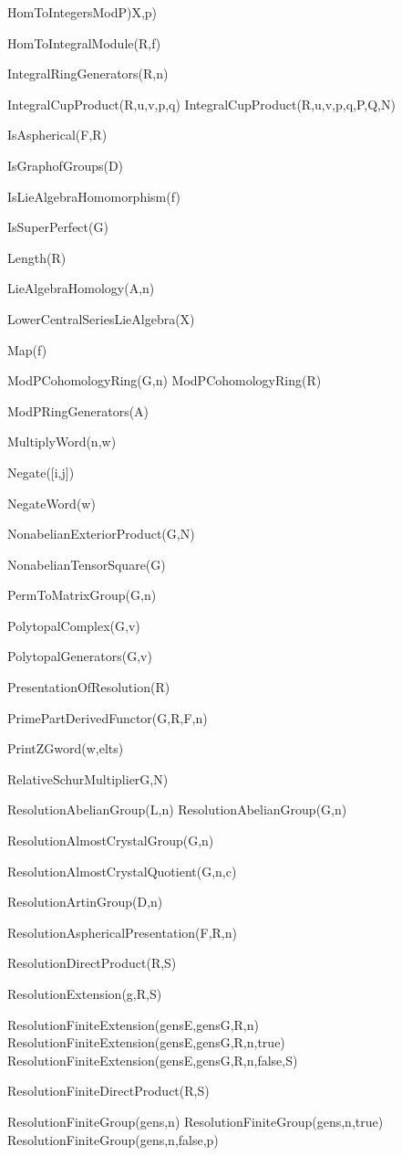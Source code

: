 \>HomToIntegersModP)X,p)

\>HomToIntegralModule(R,f)

\>IntegralRingGenerators(R,n)

\>IntegralCupProduct(R,u,v,p,q)
\>IntegralCupProduct(R,u,v,p,q,P,Q,N)

\>IsAspherical(F,R)

\>IsGraphofGroups(D)

\>IsLieAlgebraHomomorphism(f)

\>IsSuperPerfect(G)

\>Length(R)

\>LieAlgebraHomology(A,n)

\>LowerCentralSeriesLieAlgebra(X)

\>Map(f)

\>ModPCohomologyRing(G,n)
\>ModPCohomologyRing(R)

\>ModPRingGenerators(A)

\>MultiplyWord(n,w)

\>Negate([i,j])

\>NegateWord(w)

\>NonabelianExteriorProduct(G,N)

\>NonabelianTensorSquare(G)

\>PermToMatrixGroup(G,n)

\>PolytopalComplex(G,v)

\>PolytopalGenerators(G,v)

\>PresentationOfResolution(R)

\>PrimePartDerivedFunctor(G,R,F,n)

\>PrintZGword(w,elts)

\>RelativeSchurMultiplierG,N)

\>ResolutionAbelianGroup(L,n)
\>ResolutionAbelianGroup(G,n)

\>ResolutionAlmostCrystalGroup(G,n)

\>ResolutionAlmostCrystalQuotient(G,n,c)

\>ResolutionArtinGroup(D,n)

\>ResolutionAsphericalPresentation(F,R,n)
	
\>ResolutionDirectProduct(R,S)

\>ResolutionExtension(g,R,S)

\>ResolutionFiniteExtension(gensE,gensG,R,n)
\>ResolutionFiniteExtension(gensE,gensG,R,n,true)
\>ResolutionFiniteExtension(gensE,gensG,R,n,false,S)

\>ResolutionFiniteDirectProduct(R,S)

\>ResolutionFiniteGroup(gens,n)
\>ResolutionFiniteGroup(gens,n,true)
\>ResolutionFiniteGroup(gens,n,false,p)

